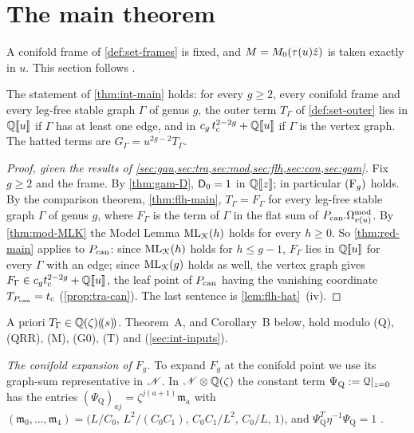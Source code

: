 \section{The main theorem}
\label{sec:mai}

A conifold frame of \cref{def:set-frames} is fixed, and $M=M_{0}(\tau(u)\hat{z})$ is taken exactly in $u$. This section follows .

\begin{thm}
\label{thm:mai-main}
The statement of \cref{thm:int-main} holds: for every $g\geq2$, every conifold frame and every leg-free stable graph $\Gamma$ of genus $g$, the outer term $T_\Gamma$ of \cref{def:set-outer} lies in $\mathbb{Q}[\![ u ]\!]$ if $\Gamma$ has at least one edge, and in $c_g\,t_{\mathrm{c}}^{2-2g}+\mathbb{Q}[\![ u ]\!]$ if $\Gamma$ is the vertex graph. The hatted terms are $G_\Gamma=u^{2g-2}T_\Gamma$.
\end{thm}

\begin{proof}[Proof, given the results of \cref{sec:gau,sec:tra,sec:mod,sec:flh,sec:con,sec:gam}]
Fix $g\geq2$ and the frame. By \cref{thm:gam-D}, $\mathsf{D}_0=1$ in $\mathbb{Q}[\![ z ]\!]$; in particular $(\mathrm{F}_{g})$ holds. By the comparison theorem, \cref{thm:flh-main}, $T_\Gamma=F_\Gamma$ for every leg-free stable graph $\Gamma$ of genus $g$, where $F_\Gamma$ is the term of $\Gamma$ in the flat sum of $P_{\mathrm{can}}.\Omega^{\mathrm{mod}}_{v(u)}$. By \cref{thm:mod-MLK} the Model Lemma $\mathrm{ML}_{\mathcal{K}}(h)$ holds for every $h\geq0$. So \cref{thm:red-main} applies to $P_{\mathrm{can}}$: since $\mathrm{ML}_{\mathcal{K}}(h)$ holds for $h\leq g-1$, $F_\Gamma$ lies in $\mathbb{Q}[\![ u ]\!]$ for every $\Gamma$ with an edge; since $\mathrm{ML}_{\mathcal{K}}(g)$ holds as well, the vertex graph gives $F_\Gamma\in c_gt_{\mathrm{c}}^{2-2g}+\mathbb{Q}[\![ u ]\!]$, the leaf point of $P_{\mathrm{can}}$ having the vanishing coordinate $T_{P_{\mathrm{can}}}=t_{\mathrm{c}}$ (\cref{prop:tra-can}). The last sentence is \cref{lem:flh-hat}~(iv).
\end{proof}

A priori $T_\Gamma\in\mathbb{Q}(\zeta)(\!(s)\!)$. Theorem~A, and Corollary~B below, hold modulo (Q), (QRR), (M), (G0), (T) and \cite[(1.7)]{AC96} (\cref{sec:int-inputs}).

\emph{The conifold expansion of $F_g$.} To expand $F_g$ at the conifold point we use its graph-sum representative in $\mathscr{N}$. In $\mathscr{N}\otimes\mathbb{Q}(\zeta)$ the constant term $\Psi_{\mathrm Q}:=\mathcal{Q}|_{z=0}$ has the entries $(\Psi_{\mathrm Q})_{aj}=\zeta^{j(a+1)}\mathfrak m_a$ with $(\mathfrak m_0,\dots,\mathfrak m_4)=\bigl(L/C_0,\,L^2/(C_0C_1),\,C_0C_1/L^2,\,C_0/L,\,1\bigr)$, and $\Psi_{\mathrm Q}^T\eta^{-1}\Psi_{\mathrm Q}=1$ .

